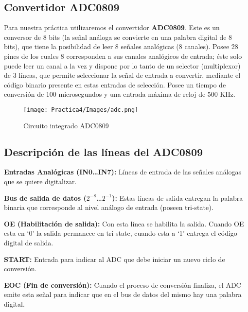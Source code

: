 \documentclass[12pt]{article}
\begin{document}
	\subsection{Convertidor ADC0809}
	Para nuestra práctica utilizaremos el   convertidor \textbf{ADC0809}. Este es un conversor de 8 bits (la señal análoga se convierte en una palabra digital de 8 bits), que tiene la posibilidad de leer 8 señales analógicas (8 canales). Posee 28 pines de los cuales 8 corresponden a sus canales analógicos de entrada; éste solo puede leer un canal a la vez y dispone por lo tanto de un selector (multiplexor) de 3 líneas,  que permite seleccionar la señal de entrada a convertir, mediante el código binario presente en estas entradas de selección. Posee un tiempo de conversión de 100 microsegundos y una entrada máxima de reloj de 500 KHz.
	
	\begin{figure}[h!]
                \centering
                \texttt{[image: Practica4/Images/adc.png]}
                \caption{Circuito integrado ADC0809}
    \end{figure} 
	
	\subsection{Descripción de las líneas del ADC0809}

	\item \textbf{Entradas Analógicas (IN0…IN7):} Líneas de entrada de las señales análogas que se quiere digitalizar.

    \item \textbf{Bus de salida de datos ($2^{-8}$…$2^{-1}$):} Estas líneas de salida entregan la palabra binaria que corresponde al nivel análogo de entrada (poseen tri-state).

    \item \textbf{OE (Habilitación de salida):} Con esta línea se habilita la salida. Cuando OE  esta en ‘0’ la salida permanece en tri-state, cuando esta a ‘1’ entrega el código digital de salida.

    \item \textbf{START:} Entrada para indicar al ADC que debe iniciar un nuevo ciclo de conversión.

    \item \textbf{EOC (Fin de conversión):} Cuando el proceso de conversión finaliza, el ADC emite esta señal para indicar que en el bus de datos del mismo hay una palabra digital.
\end{document}
